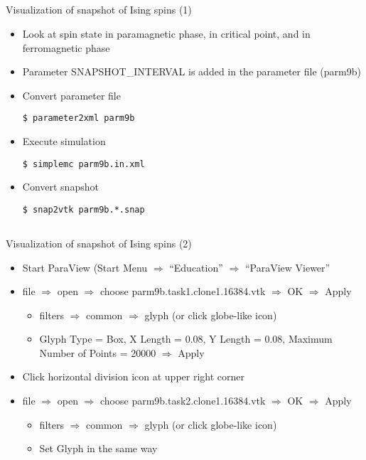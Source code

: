 \subsection*{\redb\whiteb\greenm}
\begin{frame}[t,fragile]{Visualization of snapshot of Ising spins (1)}
  \begin{itemize}
  \item Look at spin state in paramagnetic phase, in critical point, and in ferromagnetic phase
  \item Parameter SNAPSHOT\_INTERVAL is added in the parameter file (parm9b)
  \item Convert parameter file
\begin{lstlisting}
$ parameter2xml parm9b
\end{lstlisting}
  \item Execute simulation
\begin{lstlisting}
$ simplemc parm9b.in.xml
\end{lstlisting}
\item Convert snapshot
\begin{lstlisting}
$ snap2vtk parm9b.*.snap
\end{lstlisting}
  \end{itemize}
\end{frame}

\subsection*{\redb\whiteb\greenm}
\begin{frame}[t,fragile]{Visualization of snapshot of Ising spins (2)}
  \begin{itemize}
  \item Start ParaView (Start Menu $\Rightarrow$ ``Education'' $\Rightarrow$ ``ParaView Viewer''
  \item file $\Rightarrow$ open $\Rightarrow$ choose parm9b.task1.clone1.16384.vtk $\Rightarrow$ OK $\Rightarrow$ Apply
    \begin{itemize}
    \item filters $\Rightarrow$ common $\Rightarrow$ glyph (or click globe-like icon)
    \item Glyph Type = Box, X Length = 0.08, Y Length = 0.08, Maximum Number of Points = 20000 $\Rightarrow$ Apply
    \end{itemize}
  \item Click horizontal division icon at upper right corner
  \item file $\Rightarrow$ open $\Rightarrow$ choose parm9b.task2.clone1.16384.vtk $\Rightarrow$ OK $\Rightarrow$ Apply
    \begin{itemize}
    \item filters $\Rightarrow$ common $\Rightarrow$ glyph (or click globe-like icon)
    \item Set Glyph in the same way
    \end{itemize}
  \end{itemize}
\end{frame}

